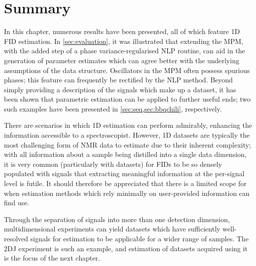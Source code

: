\section{Summary}

In this chapter, numerous results have been presented, all of which feature
\ac{1D} \ac{FID} estimation.
In \cref{sec:evaluation}, it was illustrated that extending the \ac{MPM}, with
the added step of a phase variance-regularised \ac{NLP} routine, can
aid in the generation of parameter estimates which can agree better with the
underlying assumptions of the data structure. Oscillators in the \ac{MPM} often
possess spurious phases; this feature can frequently be rectified by the
\ac{NLP} method. Beyond simply providing a description of the signals which
make up a dataset, it has been shown that parametric estimation can be applied
to further useful ends; two such examples have been presented in
\cref{sec:seq,sec:bbqchili}, respectively.

There are scenarios in which \ac{1D} estimation can perform admirably,
enhancing the information accessible to a spectroscopist. However,
\ac{1D} datasets are typically the most challenging form of \ac{NMR} data to
estimate due to their inherent complexity; with all information about a
sample being distilled into a single data dimension, it is very common
(particularly with  datasets) for \acp{FID} to be so densely
populated with signals that extracting meaningful information at
the per-signal level is futile. It should therefore be appreciated that
there is a limited scope for when estimation methods which rely minimally on
user-provided information can find use.

Through the separation of signals into more than one detection dimension,
multidimensional experiments can yield datasets which have sufficiently
well-resolved signals for estimation to be applicable for a wider range of
samples. The \ac{2DJ} experiment is such an example, and estimation of datasets
acquired using it is the focus of the next chapter.
